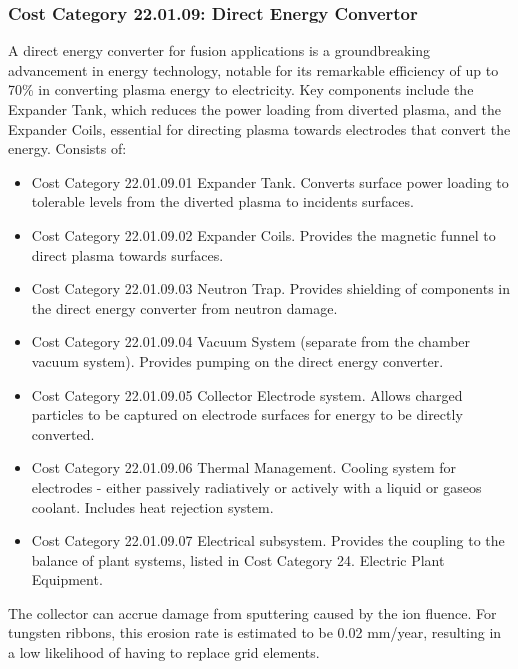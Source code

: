 
\subsubsection*{Cost Category 22.01.09: Direct Energy Convertor}

A direct energy converter for fusion applications is a groundbreaking advancement in energy technology, notable for its remarkable efficiency of up to 70\% in converting plasma energy to electricity. Key components include the Expander Tank, which reduces the power loading from diverted plasma, and the Expander Coils, essential for directing plasma towards electrodes that convert the energy.  Consists of:

\begin{itemize}
    \item Cost Category 22.01.09.01 Expander Tank. Converts surface power loading to tolerable levels from the diverted plasma to incidents surfaces.
    \item Cost Category 22.01.09.02 Expander Coils.  Provides the magnetic funnel to direct plasma towards surfaces.
    \item Cost Category 22.01.09.03 Neutron Trap.  Provides shielding of components in the direct energy converter from neutron damage.
    \item Cost Category 22.01.09.04 Vacuum System (separate from the chamber vacuum system).  Provides pumping on the direct energy converter.
    \item Cost Category 22.01.09.05 Collector Electrode system.  Allows charged particles to be captured on electrode surfaces for energy to be directly converted.
    \item Cost Category 22.01.09.06 Thermal Management.  Cooling system for electrodes - either passively radiatively or actively with a liquid or gaseos coolant.  Includes heat rejection system.
    \item Cost Category 22.01.09.07 Electrical subsystem.  Provides the coupling to the balance of plant systems, listed in Cost Category 24. Electric Plant Equipment.
\end{itemize}


The collector can accrue damage from sputtering caused by the ion fluence. For tungsten ribbons, this erosion rate is estimated to be 0.02 mm/year, resulting in a low likelihood of having to replace grid elements.\\

